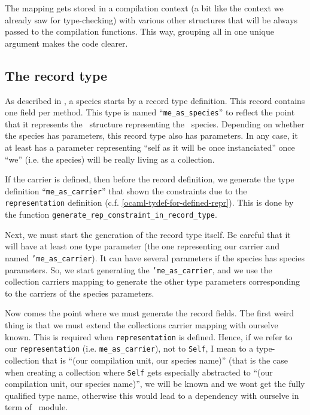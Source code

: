 \medskip
The mapping gets stored in a compilation context (a bit like the
context we already saw for type-checking) with various other
structures that will be always passed to the compilation
functions. This way, grouping all in one unique argument makes the
code clearer.

\subsection{The record type}
As described in \label{code-gen-model}, a species starts by a record
type definition. This record contains one field per method. This type
is named ``{\tt me\_as\_species}'' to reflect the point that it
represents the \ocaml\ structure representing the \focal\ species.
Depending on whether the species has parameters, this record type also
has parameters. In any case, it at least has a parameter representing
``self as it will be once instanciated'' once ``we'' (i.e. the
species) will be really living as a collection.

\medskip
If the carrier is defined, then before the record definition, we
generate the type definition ``{\tt me\_as\_carrier}'' that shown the
constraints due to the {\tt representation} definition
(c.f. \ref{ocaml-tydef-for-defined-repr}). This is done by the
function {\tt generate\_rep\_constraint\_in\_record\_type}.

\medskip
Next, we must start the generation of the record type itself. Be
careful that it will have at least one type parameter (the one
representing our carrier and named {\tt 'me\_as\_carrier}). It can
have several parameters if the species has species parameters. So, we
start generating the {\tt 'me\_as\_carrier}, and we use the collection
carriers mapping to generate the other type parameters corresponding
to the carriers of the species parameters.

\medskip
Now comes the point where we must generate the record fields. The
first weird thing is that we must extend the collections carrier mapping
with ourselve known. This is required when {\tt representation} is defined. 
Hence, if we refer to our {\tt representation} (i.e.
{\tt me\_as\_carrier}), not to {\tt Self}, I mean to a type-collection
that is ``(our compilation unit, our species name)'' (that is the case
when creating a collection where {\tt Self} gets especially abstracted
to ``(our compilation unit, our species name)'', we  will be known and
we wont get the fully qualified type name, otherwise this would lead
to a dependency with ourselve in term of \ocaml\ module.

